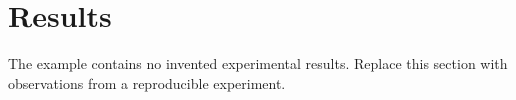 \section{Results}
The example contains no invented experimental results.
Replace this section with observations from a reproducible experiment.
